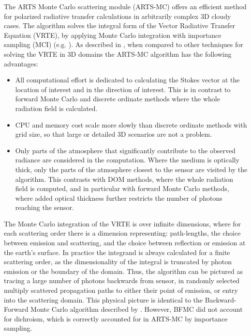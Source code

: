 The ARTS Monte Carlo scattering module (ARTS-MC) offers an efficient method for
polarized radiative transfer calculations in arbitrarily complex 3D
cloudy cases.  The algorithm solves the integral form of the Vector Radiative Transfer Equation (VRTE), by applying Monte Carlo integration with
importance sampling (MCI) (e.g. \citep{numerical_recipes_C:97}).
As described in \citep{battaglia07:_microw_jqsrt}, when compared to other techniques for solving the VRTE in 3D domains the ARTS-MC
algorithm has the following advantages:
\begin{itemize}
\item All computational effort is dedicated to calculating the Stokes
 vector at the location of interest and in the direction of
 interest. This is in contrast to forward Monte Carlo and discrete ordinate methods
 where the whole radiation field is calculated.
\item CPU and memory cost scale more slowly than discrete ordinate methods with
 grid size, so that large or detailed 3D scenarios are not a problem. 
\item Only parts of the atmosphere that
 significantly contribute to the observed radiance are considered in the
 computation. Where the medium is optically thick, only the parts of the atmosphere closest
 to the sensor are visited by the algorithm.  This contrasts with DOM
 methods, where the whole radiation field is
 computed, and in particular with forward Monte Carlo methods, where added optical thickness
 further restricts the number of photons reaching the sensor.
\end{itemize}

The Monte Carlo integration of the VRTE is over infinite dimensions, where for each scattering order there is a
dimension representing: path-lengths, the choice between emission and scattering, and the choice between reflection or emission at the earth's surface.  In practice the integrand is always calculated for
a finite scattering order, as the dimensionality of the integral is
truncated by photon emission or the boundary of the domain.  
Thus, the algorithm can be pictured as tracing a large number of photons backwards from sensor, in
randomly selected multiply scattered propagation paths to either their
point of emission, or entry into the scattering
domain.  This physical
picture is identical to the Backward-Forward Monte Carlo algorithm
described by \citep{liuetal:96}. However, BFMC did not account for
dichroism, which is correctly accounted for in ARTS-MC by importance sampling. 

